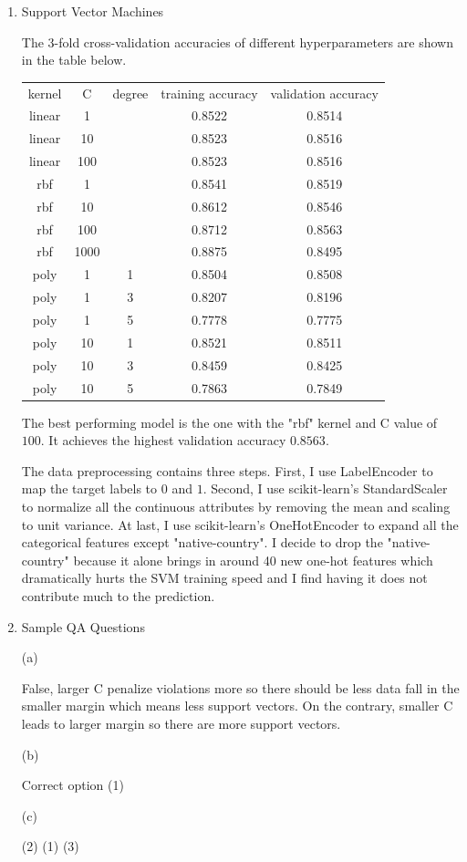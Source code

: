 \documentclass[11pt]{article}
\begin{document}
\begin{enumerate}
\item
Support Vector Machines

The 3-fold cross-validation accuracies of different hyperparameters are shown in the table below.

\begin{center}
  \begin{tabular}{ |c|c|c|c|c| }
   \hline
    kernel & C & degree & training accuracy & validation accuracy \\
    linear & 1 &  & 0.8522 & 0.8514 \\
    linear & 10 &  & 0.8523 & 0.8516 \\
    linear & 100 &  & 0.8523 & 0.8516 \\
    rbf & 1 &  & 0.8541 & 0.8519 \\
    rbf & 10 &  & 0.8612 & 0.8546 \\
    rbf & 100 &  & 0.8712 & 0.8563 \\
    rbf & 1000 &  & 0.8875 & 0.8495 \\
    poly & 1 & 1 & 0.8504 & 0.8508 \\
    poly & 1 & 3 & 0.8207 & 0.8196 \\
    poly & 1 & 5 & 0.7778 & 0.7775 \\
    poly & 10 & 1 & 0.8521 & 0.8511 \\
    poly & 10 & 3 & 0.8459 & 0.8425 \\
    poly & 10 & 5 & 0.7863 & 0.7849 \\
   \hline
  \end{tabular}
\end{center}

The best performing model is the one with the "rbf" kernel and C value of $100$. It achieves the highest validation accuracy $0.8563$.

\medskip

The data preprocessing contains three steps. First, I use LabelEncoder to map the target labels to $0$ and $1$. Second, I use scikit-learn's StandardScaler to normalize all the continuous attributes by removing the mean and scaling to unit variance. At last, I use scikit-learn's OneHotEncoder to expand all the categorical features except "native-country". I decide to drop the "native-country" because it alone brings in around 40 new one-hot features which dramatically hurts the SVM training speed and I find having it does not contribute much to the prediction.

\item
Sample QA Questions

(a)

False, larger C penalize violations more so there should be less data fall in the smaller margin which means less support vectors. On the contrary, smaller C leads to larger margin so there are more support vectors.

\medskip

(b)

Correct option (1)

\medskip

(c)

(2)  (1)  (3)



\end{enumerate}
\end{document}
